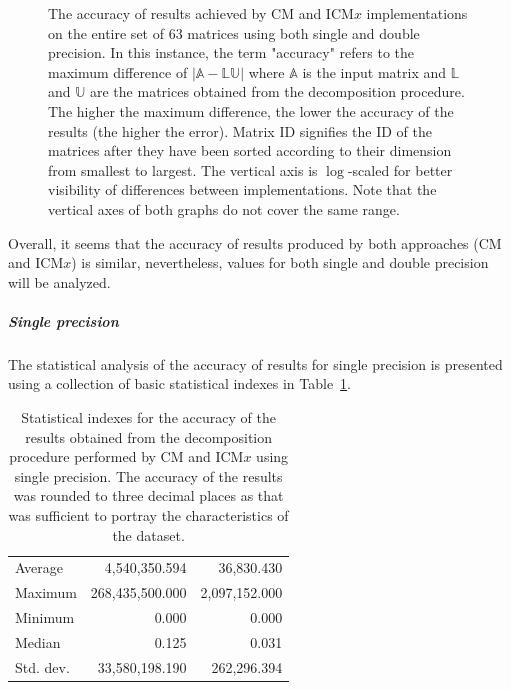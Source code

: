\begin{figure}[ht!]
\begin{subfigure}{\textwidth}
	\end{subfigure}
	\caption{The accuracy of results achieved by CM and ICM$ x $ implementations on the entire set of 63 matrices using both single and double precision. In this instance, the term "accuracy" refers to the maximum difference of $ \left| \mathbb{A} - \mathbb{L}\mathbb{U} \right| $ where $ \mathbb{A} $ is the input matrix and $ \mathbb{L} $ and $ \mathbb{U} $ are the matrices obtained from the decomposition procedure. The higher the maximum difference, the lower the accuracy of the results (the higher the error). Matrix ID signifies the ID of the matrices after they have been sorted according to their dimension from smallest to largest. The vertical axis is $ \log $-scaled for better visibility of differences between implementations. Note that the vertical axes of both graphs do not cover the same range.}
	\label{Graph:comparing-decomposition-implementations-performance-of-implementations-across-all-matrices-accuracy-single-double-precision}
\end{figure}

Overall, it seems that the accuracy of results produced by both approaches (CM and ICM$ x $) is similar, nevertheless, values for both single and double precision will be analyzed.
\subparagraph{Single precision} The statistical analysis of the accuracy of results for single precision is presented using a collection of basic statistical indexes in Table~\ref{Table:comparing-decomposition-implementations-performance-of-implementations-across-all-matrices-accuracy-statistical-indexes-single-precision}.

\begin{table}[ht!]
	\centering
	\renewcommand{\arraystretch}{1.5}
	\begin{tabular}{|>{\footnotesize}l|>{\raggedleft\arraybackslash\footnotesize}r|>{\raggedleft\arraybackslash\footnotesize}r|}
		\hline
		\multicolumn{1}{|>{\centering\footnotesize}c|}{Accuracy index} & \multicolumn{1}{>{\centering\footnotesize}c|}{CM} & \multicolumn{1}{>{\centering\footnotesize}c|}{ICM$ x $} \\
		\hline
		Average   &   4,540,350.594 &    36,830.430 \\
		Maximum   & 268,435,500.000 & 2,097,152.000 \\
		Minimum   &           0.000 &         0.000 \\
		Median    &           0.125 &         0.031 \\
		Std. dev. &  33,580,198.190 &   262,296.394 \\
		\hline
	\end{tabular}
	\caption{Statistical indexes for the accuracy of the results obtained from the decomposition procedure performed by CM and ICM$ x $ using single precision. The accuracy of the results was rounded to three decimal places as that was sufficient to portray the characteristics of the dataset.}
	\label{Table:comparing-decomposition-implementations-performance-of-implementations-across-all-matrices-accuracy-statistical-indexes-single-precision}
\end{table}

